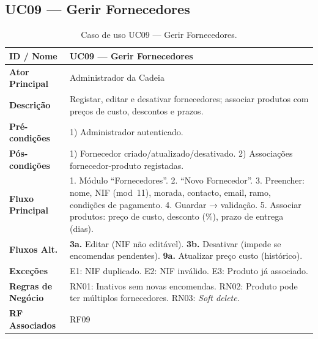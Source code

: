\documentclass[a4paper,12pt]{scrreprt}
\begin{document}
\subsection*{UC09 --- Gerir Fornecedores}
\begin{table}[H]
\centering\small
\begin{tabular}{|p{3cm}|p{11cm}|}
\hline
\textbf{ID / Nome} & UC09 --- Gerir Fornecedores \\
\hline
\textbf{Ator Principal} & Administrador da Cadeia \\
\hline
\textbf{Descrição} & Registar, editar e desativar fornecedores; associar produtos com preços de custo, descontos e prazos. \\
\hline
\textbf{Pré-condições} & 1) Administrador autenticado. \\
\hline
\textbf{Pós-condições} & 1) Fornecedor criado/atualizado/desativado. 2) Associações fornecedor-produto registadas. \\
\hline
\textbf{Fluxo Principal} & 1. Módulo ``Fornecedores''. 2. ``Novo Fornecedor''. 3. Preencher: nome, NIF (mod~11), morada, contacto, email, ramo, condições de pagamento. 4. Guardar → validação. 5. Associar produtos: preço de custo, desconto (\%), prazo de entrega (dias). \\
\hline
\textbf{Fluxos Alt.} & \textbf{3a.} Editar (NIF não editável). \textbf{3b.} Desativar (impede se encomendas pendentes). \textbf{9a.} Atualizar preço custo (histórico). \\
\hline
\textbf{Exceções} & E1: NIF duplicado. E2: NIF inválido. E3: Produto já associado. \\
\hline
\textbf{Regras de Negócio} & RN01: Inativos sem novas encomendas. RN02: Produto pode ter múltiplos fornecedores. RN03: \textit{Soft delete}. \\
\hline
\textbf{RF Associados} & RF09 \\
\hline
\end{tabular}
\caption{Caso de uso UC09 --- Gerir Fornecedores.}
\end{table}

\end{document}
